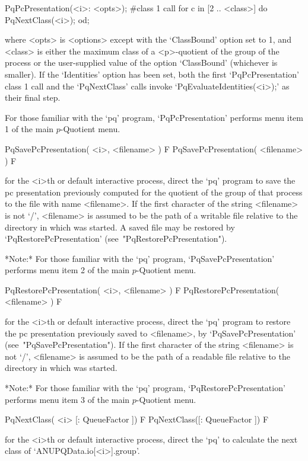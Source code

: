 PqPcPresentation(<i>: <opts>); \#class 1 call
for c in [2 .. <class>] do
PqNextClass(<i>);
od;

where <opts> is <options> except with the `ClassBound' option set  to  1,
and <class> is either the maximum class of a <p>-quotient of the group of
the process  or  the  user-supplied  value  of  the  option  `ClassBound'
(whichever is smaller). If the `Identities' option has been set, both the
first `PqPcPresentation' class 1 call and the `PqNextClass' calls  invoke
`PqEvaluateIdentities(<i>);' as their final step.

For those familiar with the  `pq'  program,  `PqPcPresentation'  performs
menu item 1 of the main $p$-Quotient menu.

\>PqSavePcPresentation( <i>, <filename> ) F
\>PqSavePcPresentation( <filename> ) F

for the <i>th or default interactive {\ANUPQ} process,  direct  the  `pq'
program to save the pc presentation previously computed for the  quotient
of the group of that process to the file with  name  <filename>.  If  the
first character of the  string  <filename>  is  not  `/',  <filename>  is
assumed to be the path of a writable file relative to  the  directory  in
which  {\GAP}  was  started.  A   saved   file   may   be   restored   by
`PqRestorePcPresentation' (see~"PqRestorePcPresentation").

*Note:* For those familiar with the `pq'  program,  `PqSavePcPresentation'
performs menu item 2 of the main $p$-Quotient menu.

\>PqRestorePcPresentation( <i>, <filename> ) F
\>PqRestorePcPresentation( <filename> ) F

for the <i>th or default interactive {\ANUPQ} process,  direct  the  `pq'
program to restore the pc presentation previously saved to <filename>, by
`PqSavePcPresentation'   (see~"PqSavePcPresentation").   If   the   first
character of the string <filename> is not `/', <filename> is  assumed  to
be the path of a readable file relative to the directory in which  {\GAP}
was started.

*Note:*
For  those  familiar  with  the  `pq'  program,  `PqRestorePcPresentation'
performs menu item 3 of the main $p$-Quotient menu.

\>PqNextClass( <i> [: QueueFactor ]) F
\>PqNextClass([: QueueFactor ]) F

for the <i>th or default interactive {\ANUPQ} process, direct the `pq' to
calculate the next class of `ANUPQData.io[<i>].group'.

